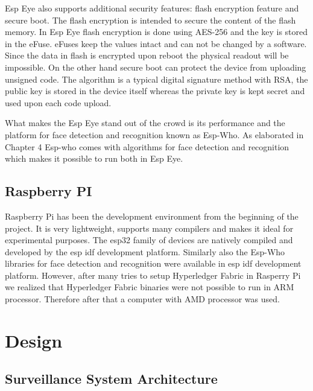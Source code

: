 Esp Eye also supports additional security features: flash encryption feature and secure boot. The flash encryption is intended to secure the content of the flash memory. In Esp Eye flash encryption is done using AES-256 and the key is stored in the eFuse. eFuses keep the values intact and can not be changed by a software. Since the data in flash is encrypted upon reboot the physical readout will be impossible. 
On the other hand secure boot can protect the device from uploading unsigned code. The algorithm is a typical digital signature method with RSA, the public key is stored in the device itself whereas the private key is kept secret and used upon each code upload. 

What makes the Esp Eye stand out of the crowd is its performance and the platform for face detection and recognition known as Esp-Who. As elaborated in Chapter 4 Esp-who comes with algorithms for face detection and recognition which makes it possible to run both in Esp Eye.

\subsection{Raspberry PI}

Raspberry Pi has been the development environment from the beginning of the project. It is very lightweight, supports many compilers and makes it ideal for experimental purposes. %
The esp32 family of devices are natively compiled and developed by the esp idf development platform.  Similarly also the Esp-Who libraries for face detection and recognition were available in esp idf development platform.
However, after many tries to setup Hyperledger Fabric in Rasperry Pi we realized that Hyperledger Fabric binaries were not possible to run in ARM processor. Therefore after that a computer with AMD processor was used. 






\section{Design}

 


\subsection{Surveillance System Architecture}

